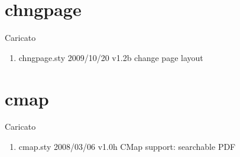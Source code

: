 \section{chngpage}

Caricato 
\begin{enumerate}
\item chngpage.sty 2009/10/20 v1.2b change page layout
\end{enumerate}
\section{cmap}

Caricato 
\begin{enumerate}
\item cmap.sty 2008/03/06 v1.0h CMap support: searchable PDF
\end{enumerate}
\lstset{language=[LaTeX]TeX} 
